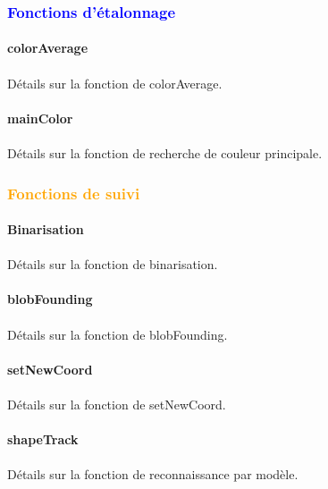 \documentclass{report}
\begin{document}
					\subsubsection{\textcolor{blue}{Fonctions d'étalonnage}}
						\paragraph{colorAverage} \paragraph{}
						Détails sur la fonction de colorAverage.
						\paragraph{mainColor} \paragraph{}
						Détails sur la fonction de recherche de couleur principale.
					\subsubsection{\textcolor{orange}{Fonctions de suivi}}
						\paragraph{Binarisation} \paragraph{}
							Détails sur la fonction de binarisation.
						\paragraph{blobFounding} \paragraph{}
						Détails sur la fonction de blobFounding.
						\paragraph{setNewCoord} \paragraph{}
						Détails sur la fonction de setNewCoord.
						\paragraph{shapeTrack} \paragraph{}
						Détails sur la fonction de reconnaissance par modèle.
						
\end{document}
